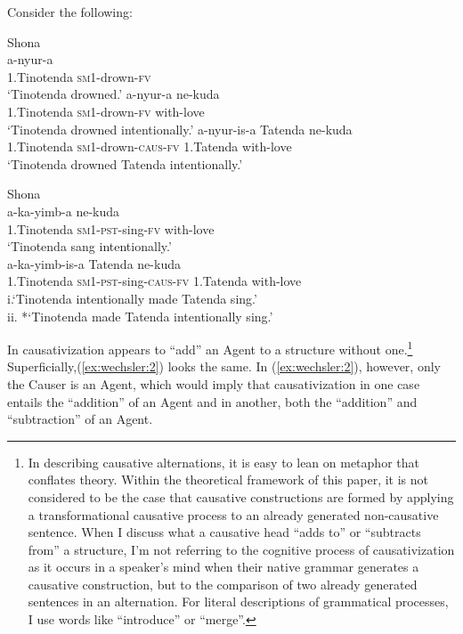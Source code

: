 \documentclass[output=paper,modfonts,nonflat]{langsci/langscibook}
\begin{document}
Consider the following:

\ea\label{ex:wechsler:1}
Shona\\
\ea\label{ex:wechsler:1a}  {a-nyur-a}\\
1.Tinotenda \textsc{sm1-}drown\textsc{-fv}\\
\glt ‘Tinotenda drowned.’
\ex\label{ex:wechsler:1b}  {a-nyur-a} {ne-kuda}\\
1.Tinotenda \textsc{sm1-}drown\textsc{-fv} with-love\\
\glt ‘Tinotenda drowned intentionally.’
\ex\label{ex:wechsler:1c}  {a-nyur-is-a} {Tatenda} {ne-kuda}\\
1.Tinotenda \textsc{sm1-}drown\textsc{-caus-fv} {1.Tatenda} {with-love}\\
\glt ‘Tinotenda drowned Tatenda intentionally.’\\
\z
\z

\ea\label{ex:wechsler:2}
Shona\\
\ea\label{ex:wechsler:2a}  {a-ka-yimb-a} {ne-kuda}\\
1.Tinotenda \textsc{sm1-pst-}sing\textsc{-fv} with-love\\
\glt ‘Tinotenda sang intentionally.’\\
\ex\label{ex:wechsler:2b}  {a-ka-yimb-is-a} {Tatenda} {ne-kuda}\\
1.Tinotenda \textsc{sm1-pst-}sing\textsc{-caus-fv} 1.Tatenda with-love\\
\glt\label{ex:wechsler:2c} i.‘Tinotenda intentionally made Tatenda sing.’\\
ii. *‘Tinotenda made Tatenda intentionally sing.’
\z
\z

In  causativization appears to “add” an Agent to a structure without one.\footnote{In describing causative alternations, it is easy to lean on metaphor that conflates theory. Within the theoretical framework of this paper, it is not considered to be the case that causative constructions are formed by applying a transformational causative process to an already generated non-causative sentence. When I discuss what a causative head “adds to” or “subtracts from” a structure, I’m not referring to the cognitive process of causativization as it occurs in a speaker’s mind when their native grammar generates a causative construction, but to the comparison of two already generated sentences in an alternation. For literal descriptions of grammatical processes, I use words like “introduce” or “merge”.} Superficially,(\ref{ex:wechsler:2}) looks the same. In (\ref{ex:wechsler:2}), however, only the Causer is an Agent, which would imply that causativization in one case entails the “addition” of an Agent and in another, both the “addition” and “subtraction” of an Agent.
\end{document}
